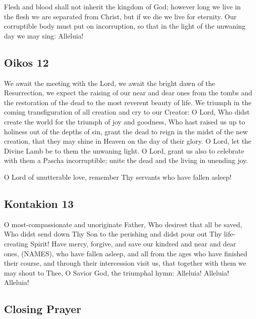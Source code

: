 Flesh and blood shall not inherit the kingdom of God; however long we live in the flesh we are separated from Christ, but if we die we live for eternity. Our corruptible body must put on incorruption, so that in the light of the unwaning day we may sing: Alleluia!

\subsection{Oikos 12}

We await the meeting with the Lord, we await the bright dawn of the Resurrection, we expect the raising of our near and dear ones from the tombs and the restoration of the dead to the most reverent beauty of life. We triumph in the coming transfiguration of all creation and cry to our Creator: O Lord, Who didst create the world for the triumph of joy and goodness, Who hast raised us up to holiness out of the depths of sin, grant the dead to reign in the midst of the new creation, that they may shine in Heaven on the day of their glory. O Lord, let the Divine Lamb be to them the unwaning light. O Lord, grant us also to celebrate with them a Pascha incorruptible; unite the dead and the living in unending joy.

O Lord of unutterable love, remember Thy servants who have fallen asleep!

\subsection{Kontakion 13}

O most-compassionate and unoriginate Father, Who desirest that all be saved, Who didst send down Thy Son to the perishing and didst pour out Thy life-creating Spirit! Have mercy, forgive, and save our kindred and near and dear ones, (NAMES), who have fallen asleep, and all from the ages who have finished their course, and through their intercession visit us, that together with them we may shout to Thee, O Savior God, the triumphal hymn: Alleluia! Alleluia! Alleluia!


\subsection{Closing Prayer}

